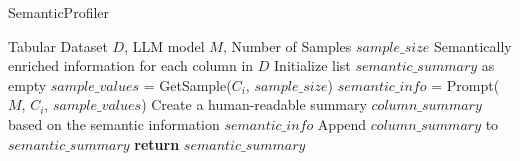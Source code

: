 \begin{algorithm}[t]
  \caption{SemanticProfiler}
  \label{alg:semantic_type_analyzer}
\begin{algorithmic}[1]
   Tabular Dataset $D$, LLM model $M$, Number of Samples $sample\_size$
   Semantically enriched information for each column in $D$
  \STATE Initialize list $semantic\_summary$ as empty
      \STATE $sample\_values$ = GetSample($C_i$, $sample\_size$)
      \STATE $semantic\_info$ = Prompt($M$, $C_i$, $sample\_values$)
      \STATE Create a human-readable summary $column\_summary$ based on the semantic information $semantic\_info$
      \STATE Append $column\_summary$ to $semantic\_summary$
  \ENDFOR
  \STATE \textbf{return} $semantic\_summary$
\end{algorithmic}
\end{algorithm}










